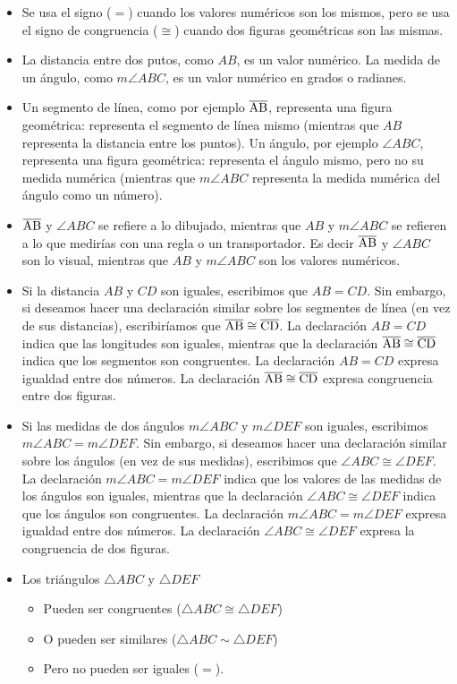 \begin{itemize}
    \item Se usa el signo ($=$) cuando los valores numéricos son los mismos, pero se usa el signo de congruencia ($\cong$) cuando dos figuras geométricas son las mismas.   
    \item La distancia entre dos putos, como $AB$, es un valor numérico. La medida de un ángulo, como $m\angle{ABC}$, es un valor numérico en grados o radianes.
    \item Un segmento de línea, como por ejemplo $\overline{\rm AB}$, representa una figura geométrica: representa el segmento de línea mismo (mientras que $AB$ representa la distancia entre los puntos). Un ángulo, por ejemplo $\angle{ABC}$, representa una figura geométrica: representa el ángulo mismo, pero no su medida numérica (mientras que $m\angle{ABC}$ representa la medida numérica del ángulo como un número).
    \item $\overline{\rm AB}$ y $\angle{ABC}$ se refiere a lo dibujado, mientras que $AB$ y $m\angle{ABC}$ se refieren a lo que medirías con una regla o un transportador. Es decir $\overline{\rm AB}$ y $\angle{ABC}$ son lo visual, mientras que $AB$ y $m\angle{ABC}$ son los valores numéricos.
    \item Si la distancia $AB$ y $CD$ son iguales, escribimos que $AB = CD$. Sin embargo, si deseamos hacer una declaración similar sobre los segmentes de línea (en vez de sus distancias), escribiríamos que $\overline{\rm AB} \cong \overline{\rm CD}$. La declaración $AB = CD$ indica que las longitudes son iguales, mientras que la declaración $\overline{\rm AB} \cong \overline{\rm CD}$ indica que los segmentos son congruentes. La declaración $AB = CD$ expresa igualdad entre dos números. La declaración $\overline{\rm AB} \cong \overline{\rm CD}$ expresa congruencia entre dos figuras.
    \item Si las medidas de dos ángulos $m\angle{ABC}$ y $m\angle{DEF}$ son iguales, escribimos $m\angle{ABC} = m\angle{DEF}$. Sin embargo, si deseamos hacer una declaración similar sobre los ángulos (en vez de sus medidas), escribimos que $\angle{ABC} \cong \angle{DEF}$. La declaración $m\angle{ABC} = m\angle{DEF}$ indica que los valores de las medidas de los ángulos son iguales, mientras que la declaración $\angle{ABC} \cong \angle{DEF}$ indica que los ángulos son congruentes. La declaración $m\angle{ABC} = m\angle{DEF}$ expresa igualdad entre dos números. La declaración $\angle{ABC} \cong \angle{DEF}$ expresa la congruencia de dos figuras.
    \item Los triángulos $\triangle{ABC}$ y $\triangle{DEF}$
    \begin{itemize}
        \item Pueden ser congruentes ($\triangle{ABC} \cong \triangle{DEF}$) 
        \item O pueden ser similares ($\triangle{ABC} \sim \triangle{DEF}$)
        \item Pero no pueden ser iguales ($=$).
    \end{itemize}     
\end{itemize}

